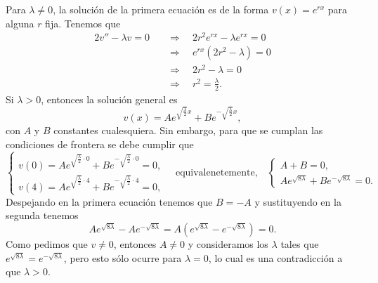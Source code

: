 \documentclass[12pt]{article}
\newcommand{\pp}[1]{\left( #1 \right)}
\newcommand{\Text}[1]{\quad\text{#1}\quad}
\newcommand{\Imp}{\quad\Longrightarrow\quad}
\renewcommand{\l}{\lambda}
\begin{document}
\begin{enumerate}
\begin{enumerate}
            Para $\l\neq 0$, la solución de la primera ecuación es de la forma $v(x)=e^{rx}$ para alguna $r$ fija. Tenemos que
            \begin{align*}
                2v''-\l v =0 &\Imp2r^2e^{rx}-\l e^{rx}=0\\
                & \Imp e^{rx}(2r^2-\l)=0\\
                &\Imp 2r^2-\l=0\\
                &\Imp r^2=\frac{\l}{2}.
            \end{align*}
            Si $\l>0$, entonces la solución general es
            \[ v(x) = A e^{\sqrt{\tfrac{\l}{2}}x} + B e^{-\sqrt{\tfrac{\l}{2}}x}, \]
            con $A$ y $B$ constantes cualesquiera. Sin embargo, para que se cumplan las condiciones de frontera se debe cumplir que
            \[
            \begin{cases}
                v(0)=A e^{\sqrt{\tfrac{\l}{2}}\cdot 0} + B e^{-\sqrt{\tfrac{\l}{2}}\cdot 0} =0,\\
                v(4)=A e^{\sqrt{\tfrac{\l}{2}}\cdot 4} + B e^{-\sqrt{\tfrac{\l}{2}}\cdot4}=0,
            \end{cases}
            \Text{equivalenetemente,}
            \begin{cases}
                A + B  =0,\\
                A e^{\sqrt{8\l}} + B e^{-\sqrt{8\l}}=0.
            \end{cases}
            \]
            Despejando en la primera ecuación tenemos que $B=-A$ y sustituyendo en la segunda tenemos
            \[ A e^{\sqrt{8\l}} -A e^{-\sqrt{8\l}}=A\pp{e^{\sqrt{8\l}} -e^{-\sqrt{8\l}}}=0. \]
            Como pedimos que $v\neq 0$, entonces $A\neq 0$ y consideramos los $\l$ tales que $e^{\sqrt{8\l}} =e^{-\sqrt{8\l}}$, pero esto sólo ocurre para $\l=0$, lo cual es una contradicción a que $\l>0$.


\end{enumerate}
\end{enumerate}
\end{document}
